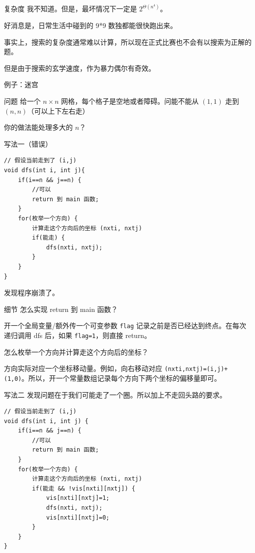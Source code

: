 \documentclass[11pt,aspectratio=169]{beamer}
\begin{document}
\begin{frame}{复杂度}
    我不知道。但是，最坏情况下一定是 $2^{\Theta(n^4)}$。

    好消息是，日常生活中碰到的 9*9 数独都能很快跑出来。

    事实上，搜索的复杂度通常难以计算，所以现在正式比赛也不会有以搜索为正解的题。

    但是由于搜索的玄学速度，作为暴力偶尔有奇效。
\end{frame}

\begin{frame}{例子：迷宫}
    \begin{block}{问题}
        给一个 $n\times n$ 网格，每个格子是空地或者障碍。问能不能从 $(1,1)$ 走到 $(n,n)$（可以上下左右走）
    \end{block}

    你的做法能处理多大的 $n$？
\end{frame}

\begin{frame}[fragile]{写法一（错误）}
\begin{lstlisting}
// 假设当前走到了 (i,j) 
void dfs(int i, int j){
    if(i==n && j==n) {
        //可以
        return 到 main 函数;
    }
    for(枚举一个方向) {
        计算走这个方向后的坐标 (nxti, nxtj)
        if(能走) {
            dfs(nxti, nxtj);
        }
    }
}
\end{lstlisting}

发现程序崩溃了。
\end{frame}
\begin{frame}{细节}
    怎么实现 return 到 main 函数？

    开一个全局变量/额外传一个可变参数 \texttt{flag} 记录之前是否已经达到终点。在每次递归调用 dfs 后，如果 \texttt{flag=1}，则直接 return。

    怎么枚举一个方向并计算走这个方向后的坐标？

    方向实际对应一个坐标移动量。例如，向右移动对应 \texttt{(nxti,nxtj)=(i,j)+(1,0)}。所以，开一个常量数组记录每个方向下两个坐标的偏移量即可。
\end{frame}
\begin{frame}[fragile]{写法二}
发现问题在于我们可能走了一个圈。所以加上不走回头路的要求。

\begin{lstlisting}
// 假设当前走到了 (i,j) 
void dfs(int i, int j) {
    if(i==n && j==n) {
        //可以
        return 到 main 函数;
    }
    for(枚举一个方向) {
        计算走这个方向后的坐标 (nxti, nxtj)
        if(能走 && !vis[nxti][nxtj]) {
            vis[nxti][nxtj]=1;
            dfs(nxti, nxtj);
            vis[nxti][nxtj]=0;
        }
    }
}
\end{lstlisting}    
\end{frame}
\end{document}
